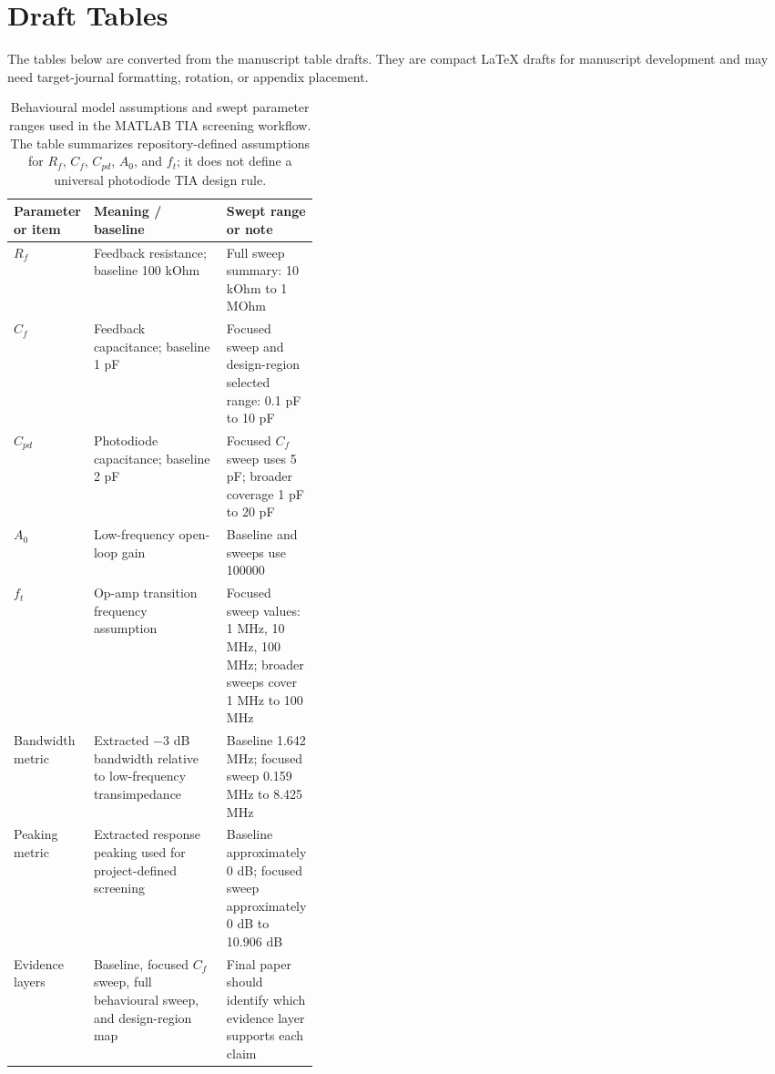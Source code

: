 \section{Draft Tables}

The tables below are converted from the manuscript table drafts. They are compact LaTeX drafts for manuscript development and may need target-journal formatting, rotation, or appendix placement.

\begin{table}[htbp]
\centering
\small
\caption{Behavioural model assumptions and swept parameter ranges used in the MATLAB TIA screening workflow. The table summarizes repository-defined assumptions for $R_f$, $C_f$, $C_{pd}$, $A_0$, and $f_t$; it does not define a universal photodiode TIA design rule.}
\label{tab:model-assumptions}
\begin{tabularx}{\linewidth}{>{\raggedright\arraybackslash}p{0.18\linewidth} >{\raggedright\arraybackslash}X >{\raggedright\arraybackslash}p{0.21\linewidth}}
\toprule
Parameter or item & Meaning / baseline & Swept range or note \\
\midrule
$R_f$ & Feedback resistance; baseline 100 kOhm & Full sweep summary: 10 kOhm to 1 MOhm \\
$C_f$ & Feedback capacitance; baseline 1 pF & Focused sweep and design-region selected range: 0.1 pF to 10 pF \\
$C_{pd}$ & Photodiode capacitance; baseline 2 pF & Focused $C_f$ sweep uses 5 pF; broader coverage 1 pF to 20 pF \\
$A_0$ & Low-frequency open-loop gain & Baseline and sweeps use 100000 \\
$f_t$ & Op-amp transition frequency assumption & Focused sweep values: 1 MHz, 10 MHz, 100 MHz; broader sweeps cover 1 MHz to 100 MHz \\
Bandwidth metric & Extracted $-3$ dB bandwidth relative to low-frequency transimpedance & Baseline 1.642 MHz; focused sweep 0.159 MHz to 8.425 MHz \\
Peaking metric & Extracted response peaking used for project-defined screening & Baseline approximately 0 dB; focused sweep approximately 0 dB to 10.906 dB \\
Evidence layers & Baseline, focused $C_f$ sweep, full behavioural sweep, and design-region map & Final paper should identify which evidence layer supports each claim \\
\bottomrule
\end{tabularx}
\end{table}

